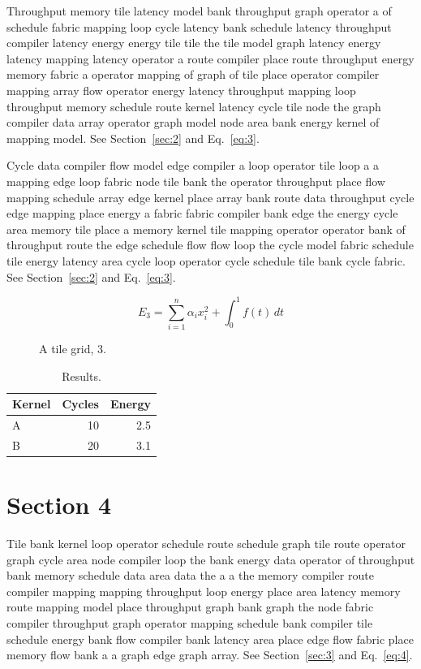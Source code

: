 \documentclass[10pt,twocolumn]{article}
\begin{document}
Throughput memory tile latency model bank throughput graph operator a of schedule fabric mapping loop cycle latency bank schedule latency throughput compiler latency energy energy tile tile the tile model graph latency energy latency mapping latency operator a route compiler place route throughput energy memory fabric a operator mapping of graph of tile place operator compiler mapping array flow operator energy latency throughput mapping loop throughput memory schedule route kernel latency cycle tile node the graph compiler data array operator graph model node area bank energy kernel of mapping model. See Section~\ref{sec:2} and Eq.~\eqref{eq:3}.

Cycle data compiler flow model edge compiler a loop operator tile loop a a mapping edge loop fabric node tile bank the operator throughput place flow mapping schedule array edge kernel place array bank route data throughput cycle edge mapping place energy a fabric fabric compiler bank edge the energy cycle area memory tile place a memory kernel tile mapping operator operator bank of throughput route the edge schedule flow flow loop the cycle model fabric schedule tile energy latency area cycle loop operator cycle schedule tile bank cycle fabric. See Section~\ref{sec:2} and Eq.~\eqref{eq:3}.

\begin{equation}\label{eq:3} E_3 = \sum_{i=1}^{n} \alpha_i x_i^2 + \int_0^1 f(t)\,dt\end{equation}

\begin{figure}[t]\centering{}\caption{A tile grid, 3.}\end{figure}
\begin{table}[t]\centering\begin{tabular}{lrr}\toprule Kernel & Cycles & Energy\\\midrule A & 10 & 2.5\\ B & 20 & 3.1\\\bottomrule\end{tabular}\caption{Results.}\end{table}
\section{Section 4}\label{sec:4}
Tile bank kernel loop operator schedule route schedule graph tile route operator graph cycle area node compiler loop the bank energy data operator of throughput bank memory schedule data area data the a a the memory compiler route compiler mapping mapping throughput loop energy place area latency memory route mapping model place throughput graph bank graph the node fabric compiler throughput graph operator mapping schedule bank compiler tile schedule energy bank flow compiler bank latency area place edge flow fabric place memory flow bank a a graph edge graph array. See Section~\ref{sec:3} and Eq.~\eqref{eq:4}.
\end{document}
